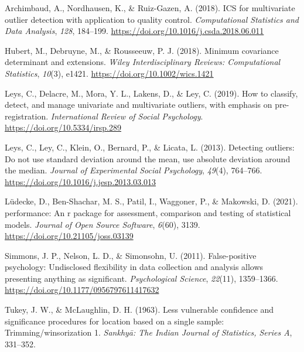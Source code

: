 \documentclass[
]{article}
\newlength{\cslhangindent}
\newlength{\cslentryspacingunit} %
\newenvironment{CSLReferences}[2] %
 {%
  \setlength{\parindent}{0pt}
  \ifodd #1
  \let\oldpar\par
  \def\par{\hangindent=\cslhangindent\oldpar}
  \fi
  \setlength{\parskip}{#2\cslentryspacingunit}
 }%
 {}
\begin{document}
\hypertarget{refs}{}
\begin{CSLReferences}{1}{0}
\leavevmode{}%
Archimbaud, A., Nordhausen, K., \& Ruiz-Gazen, A. (2018). ICS for
multivariate outlier detection with application to quality control.
\emph{Computational Statistics and Data Analysis}, \emph{128}, 184--199.
\url{https://doi.org/10.1016/j.csda.2018.06.011}

\leavevmode{}%
Hubert, M., Debruyne, M., \& Rousseeuw, P. J. (2018). Minimum covariance
determinant and extensions. \emph{Wiley Interdisciplinary Reviews:
Computational Statistics}, \emph{10}(3), e1421.
\url{https://doi.org/10.1002/wics.1421}

\leavevmode{}%
Leys, C., Delacre, M., Mora, Y. L., Lakens, D., \& Ley, C. (2019). How
to classify, detect, and manage univariate and multivariate outliers,
with emphasis on pre-registration. \emph{International Review of Social
Psychology}. \url{https://doi.org/10.5334/irsp.289}

\leavevmode{}%
Leys, C., Ley, C., Klein, O., Bernard, P., \& Licata, L. (2013).
Detecting outliers: Do not use standard deviation around the mean, use
absolute deviation around the median. \emph{Journal of Experimental
Social Psychology}, \emph{49}(4), 764--766.
\url{https://doi.org/10.1016/j.jesp.2013.03.013}

\leavevmode{}%
Lüdecke, D., Ben-Shachar, M. S., Patil, I., Waggoner, P., \& Makowski,
D. (2021). {performance}: An r package for assessment, comparison and
testing of statistical models. \emph{Journal of Open Source Software},
\emph{6}(60), 3139. \url{https://doi.org/10.21105/joss.03139}

\leavevmode{}%
Simmons, J. P., Nelson, L. D., \& Simonsohn, U. (2011). False-positive
psychology: Undisclosed flexibility in data collection and analysis
allows presenting anything as significant. \emph{Psychological Science},
\emph{22}(11), 1359--1366.
\url{https://doi.org/10.1177/0956797611417632}

\leavevmode{}%
Tukey, J. W., \& McLaughlin, D. H. (1963). Less vulnerable confidence
and significance procedures for location based on a single sample:
Trimming/winsorization 1. \emph{Sankhy{ā}: The Indian Journal of
Statistics, Series A}, 331--352.

\end{CSLReferences}
\end{document}

